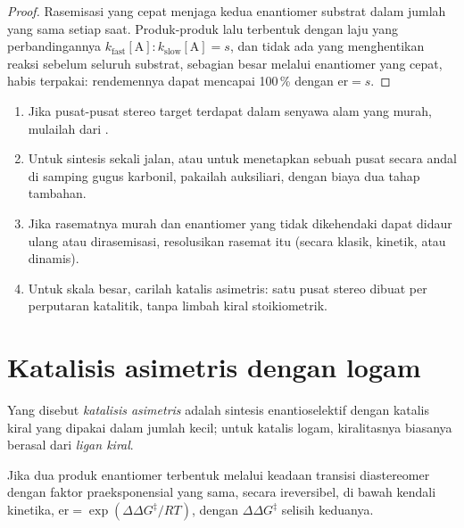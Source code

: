 \begin{proof}
Rasemisasi yang cepat menjaga kedua enantiomer substrat dalam jumlah yang sama setiap
saat. Produk-produk lalu terbentuk dengan laju yang perbandingannya $k_{\mathrm{fast}}[\mathrm A] : k_{\mathrm{slow}}[\mathrm A] = s$, dan tidak ada yang
menghentikan reaksi sebelum seluruh substrat, sebagian besar melalui enantiomer yang cepat,
habis terpakai: rendemennya dapat mencapai 100\,\% dengan $\mathrm{er} = s$.
\end{proof}

\begin{method}\label{met:b3:asymmetric-synthesis:strategy}
\begin{enumerate}
  \item Jika pusat-pusat stereo target terdapat dalam senyawa alam yang murah, mulailah
        dari .
  \item Untuk sintesis sekali jalan, atau untuk menetapkan sebuah pusat secara andal di samping gugus
        karbonil, pakailah auksiliari, dengan biaya dua tahap tambahan.
  \item Jika rasematnya murah dan enantiomer yang tidak dikehendaki dapat didaur ulang atau
        dirasemisasi, resolusikan rasemat itu (secara klasik, kinetik, atau dinamis).
  \item Untuk skala besar, carilah katalis asimetris: satu pusat stereo dibuat
        per perputaran katalitik, tanpa limbah kiral stoikiometrik.
\end{enumerate}
\end{method}

\section{Katalisis asimetris dengan logam}

\begin{definition}\label{def:b3:asymmetric-synthesis:asymmetric-catalysis}
Yang disebut \emph{katalisis asimetris} adalah sintesis
enantioselektif dengan katalis kiral yang dipakai dalam jumlah kecil; untuk katalis logam,
kiralitasnya biasanya berasal dari \emph{ligan kiral}.
\end{definition}

\begin{theorem}\label{thm:b3:asymmetric-synthesis:er-ddg}
Jika dua produk enantiomer terbentuk melalui keadaan transisi diastereomer
dengan faktor praeksponensial yang sama, secara ireversibel, di bawah kendali kinetika,
$\mathrm{er} = \exp(\Delta\Delta G^\ddagger/RT)$, dengan $\Delta\Delta G^\ddagger$ selisih  keduanya.
\end{theorem}

